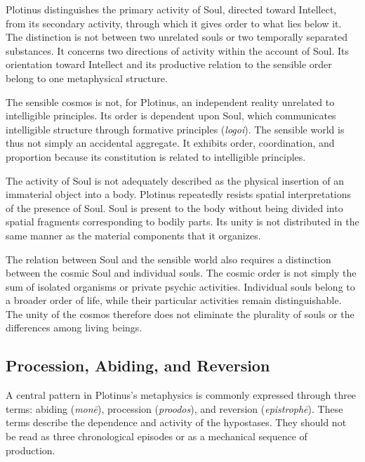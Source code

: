 \label{para:VS.B01.P01.C08.S06.SS04.P002}
Plotinus distinguishes the primary activity of Soul, directed toward
Intellect, from its secondary activity, through which it gives order
to what lies below it. The distinction is not between two unrelated
souls or two temporally separated substances. It concerns two
directions of activity within the account of Soul. Its orientation
toward Intellect and its productive relation to the sensible order
belong to one metaphysical structure.

\label{para:VS.B01.P01.C08.S06.SS04.P003}
The sensible cosmos is not, for Plotinus, an independent reality
unrelated to intelligible principles. Its order is dependent upon
Soul, which communicates intelligible structure through formative
principles (\textit{logoi}). The sensible world is thus not simply
an accidental aggregate. It exhibits order, coordination, and
proportion because its constitution is related to intelligible
principles.

\label{para:VS.B01.P01.C08.S06.SS04.P004}
The activity of Soul is not adequately described as the physical
insertion of an immaterial object into a body. Plotinus repeatedly
resists spatial interpretations of the presence of Soul. Soul is
present to the body without being divided into spatial fragments
corresponding to bodily parts. Its unity is not distributed in the
same manner as the material components that it organizes.

\label{para:VS.B01.P01.C08.S06.SS04.P005}
The relation between Soul and the sensible world also requires a
distinction between the cosmic Soul and individual souls. The
cosmic order is not simply the sum of isolated organisms or private
psychic activities. Individual souls belong to a broader order of
life, while their particular activities remain distinguishable.
The unity of the cosmos therefore does not eliminate the plurality
of souls or the differences among living beings.

\subsection{Procession, Abiding, and Reversion}
\label{subsec:ch08-plotinus-three-moments}

\label{para:VS.B01.P01.C08.S06.SS05.P001}
A central pattern in Plotinus's metaphysics is commonly expressed
through three terms: abiding (\textit{monē}), procession
(\textit{proodos}), and reversion (\textit{epistrophē}). These terms
describe the dependence and activity of the hypostases. They should
not be read as three chronological episodes or as a mechanical
sequence of production.


